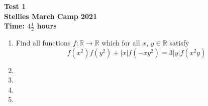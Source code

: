 \documentclass{article}
\begin{document}
\thispagestyle{empty}

\begin{center}
  \textbf{\Large Test 1}
  \\ \vspace{1em}
  \textbf{\large Stellies March Camp 2021}
  \\ \vspace{1em}
  \textbf{\large Time: $4\frac{1}{2}$ hours}
\end{center}

\vspace{24pt}

\begin{enumerate}

\item %
Find all functions $f : \mathbb{R} \to \mathbb{R}$ which for all $x$, $y \in \mathbb{R}$ satisfy
$$f(x^{2})f(y^{2}) + |x|f(-xy^{2}) = 3|y|f(x^{2}y)$$



\item %


\item %


\item %


\item %


\end{enumerate}

\vfill
\centering
\begin{BVerbatim}
\end{BVerbatim}
\end{document}
